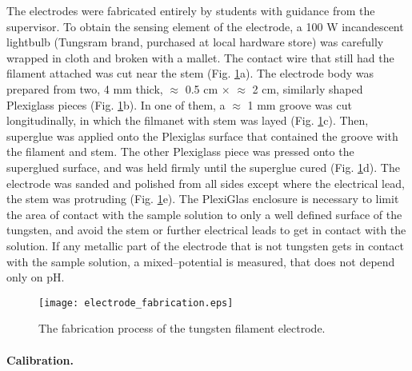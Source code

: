 \documentclass[manuscript=article, journal=jceda8]{achemso}
\begin{document}
The electrodes were fabricated entirely by students with guidance from the supervisor. To obtain the sensing element of the electrode, a 100 W incandescent lightbulb (Tungsram brand, purchased at local hardware store) was carefully wrapped in cloth and broken with a mallet. The contact wire that still had the filament attached was cut near the stem (Fig. \ref{fig:fabrication}a). The electrode body was prepared from two, 4 mm thick, $\approx$ 0.5 cm $\times$ $\approx$ 2 cm, similarly shaped Plexiglass pieces (Fig. \ref{fig:fabrication}b). In one of them, a $\approx$ 1 mm groove was cut longitudinally, in which the filmanet with stem was layed (Fig. \ref{fig:fabrication}c). Then, superglue was applied onto the Plexiglas surface that contained the groove with the filament and stem. The other Plexiglass piece was pressed onto the superglued surface, and was held firmly until the superglue cured (Fig. \ref{fig:fabrication}d). The electrode was sanded and polished from all sides except where the electrical lead, the stem was protruding (Fig. \ref{fig:fabrication}e). The PlexiGlas enclosure is necessary to limit the area of contact with the sample solution to only a well defined surface of the tungsten, and avoid the stem or further electrical leads to get in contact with the solution. If any metallic part of the electrode that is not tungsten gets in contact with the sample solution, a mixed--potential is measured, that does not depend only on pH.

\begin{figure}
\centering
\texttt{[image: electrode\_fabrication.eps]}
\caption{The fabrication process of the tungsten filament electrode. }
\label{fig:fabrication}
\end{figure}

\paragraph{Calibration.}
\end{document}
